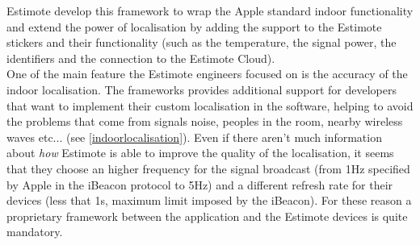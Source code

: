 Estimote develop this framework to wrap the Apple standard indoor functionality and extend the power of localisation by adding the support to the Estimote stickers and their functionality (such as the temperature, the signal power, the identifiers and the connection to the Estimote Cloud).\\

One of the main feature the Estimote engineers focused on is the accuracy of the indoor localisation. The frameworks provides additional support for developers that want to implement their custom localisation in the software, helping to avoid the problems that come from signals noise, peoples in the room, nearby wireless waves etc... (see \ref{indoorlocalisation}). Even if there aren't much information about \emph{how} Estimote is able to improve the quality of the localisation, it seems that they choose an higher frequency for the signal broadcast (from 1Hz specified by Apple in the iBeacon protocol to 5Hz) and a different refresh rate for their devices (less that 1s, maximum limit imposed by the iBeacon). For these reason a proprietary framework between the application and the Estimote devices is quite mandatory.

